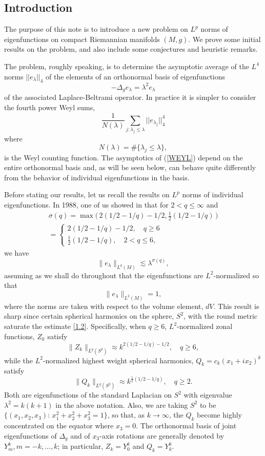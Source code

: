 \documentclass[10pt]{amsart}
\begin{document}
{\subsection{{Introduction}}\setcounter{theorem}{0} \setcounter{equation}{0}
\par\noindent}

The purpose of this note is to introduce a new problem on $L^p$
norms of eigenfunctions on compact Riemannian manifolds $(M,g)$.
We   prove some initial
  results on the problem,  and also include
some conjectures and heuristic remarks.

The problem, roughly speaking, is to determine the asymptotic
average of the  $L^4$ norms $||e_{\lambda}||_4$ of the elements of
an orthonormal basis of eigenfunctions
$$-\Delta_g e_\lambda = \lambda^2 e_\lambda$$
of the associated Laplace-Beltrami operator. In practice it is
simpler to consider the fourth power Weyl sums,
\begin{equation} \label{WEYL} \frac{1}{N(\lambda)} \sum_{j: \lambda_j \leq \lambda}
||e_{\lambda_j}||_4^4 \end{equation} where
$$N(\lambda)=\#\{\lambda_j\le \lambda\},$$
is the Weyl counting function. The asymptotics of (\ref{WEYL})
depend on the entire orthonormal basis and, as will be seen below,
can behave quite differently from the behavior of individual
eigenfunctions in the basis.

Before stating our results, let us recall the results on $L^p$
norms of individual eigenfunctions. In 1988, one of us showed in
\cite{soggeest} that for $2<q\le \infty$ and
\begin{multline}\label{1.1}\sigma(q)=\max \bigl(\, 2(1/2-1/q)-1/2, \tfrac12(1/2-1/q)\, \bigr)
\\
=
\begin{cases}
2(1/2-1/q)-1/2, \quad q\ge 6
\\
\tfrac12(1/2-1/q), \quad 2< q\le 6,
\end{cases}
\end{multline}
we have
\begin{equation}\label{1.2}
\|e_\lambda\|_{L^q(M)}\lesssim \lambda^{\sigma(q)},
\end{equation}
assuming as we shall do throughout that the eigenfunctions
are $L^2$-normalized so that
$$\|e_\lambda\|_{L^2(M)}=1,$$
where the norms are taken with respect to the volume element, $dV$.
This result is sharp since certain spherical harmonics on the
sphere, $S^2$, with the round metric saturate the estimate \eqref{1.2}.
Specifically, when $q\ge6$, $L^2$-normalized zonal functions,
$Z_k$ satisfy
$$\|Z_k\|_{L^q(S^2)}\approx k^{2(1/2-1/q)-1/2}, \quad q\ge6,$$
while the $L^2$-normalized highest weight spherical harmonics,
$Q_k=c_k(x_1+ix_2)^k$ satisfy
$$\|Q_k\|_{L^q(S^2)}\approx k^{\tfrac12(1/2-1/q)}, \quad q\ge 2.$$
Both are eigenfunctions of the standard Laplacian on $S^2$ with
eigenvalue $\lambda^2=k(k+1)$ in the above notation. Also, we are
taking $S^2$ to be $\{(x_1,x_2,x_3): \, x_1^2+x_2^2+x_3^2=1\}$, so
that, as $k\to \infty$, the $Q_k$ become highly concentrated on
the equator where $x_3=0$. The orthonormal basis of joint
eigenfunctions of $\Delta_g$ and of $x_3$-axis rotations are
generally denoted by $Y^k_m, m = - k, \dots, k$; in particular,
$Z_k  = Y^k_0$ and $Q_k = Y_k^k$.
\end{document}
